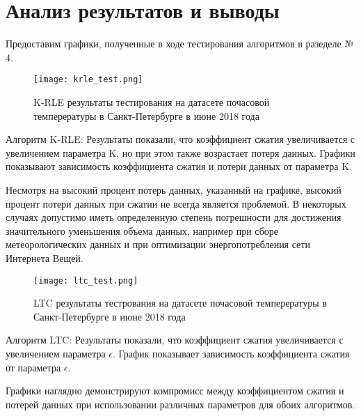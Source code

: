 \chapter{Анализ результатов и выводы}

Предоставим графики, полученные в ходе тестирования алгоритмов в разеделе № 4.

\begin{figure}[ht]
    \centering
    \texttt{[image: krle\_test.png]}
    \caption{K-RLE результаты тестирования на датасете почасовой темперературы в Санкт-Петербурге в июне 2018 года}
    \label{fig:krle_test}
\end{figure}
Алгоритм K-RLE: Результаты показали, что коэффициент сжатия увеличивается с увеличением параметра K, но при этом также возрастает потеря данных. Графики показывают зависимость коэффициента сжатия и потери данных от параметра K.

Несмотря на высокий процент потерь данных, указанный на графике, высокий процент потери данных при сжатии не всегда является проблемой. В некоторых случаях допустимо иметь определенную степень погрешности для достижения значительного уменьшения объема данных, например при сборе метеорологических данных и при оптимизации энергопотребления сети Интернета Вещей.

\begin{figure}[ht]
    \centering
    \texttt{[image: ltc\_test.png]}
    \caption{LTC результаты тестрования на датасете почасовой темперературы в Санкт-Петербурге в июне 2018 года}
    \label{fig:ltc_test}
\end{figure}
Алгоритм LTC: Результаты показали, что коэффициент сжатия увеличивается с увеличением параметра $\epsilon$. График показывает зависимость коэффициента сжатия от параметра $\epsilon$. 

Графики наглядно демонстрируют компромисс между коэффициентом сжатия и потерей данных при использовании различных параметров для обоих алгоритмов.

\endinput